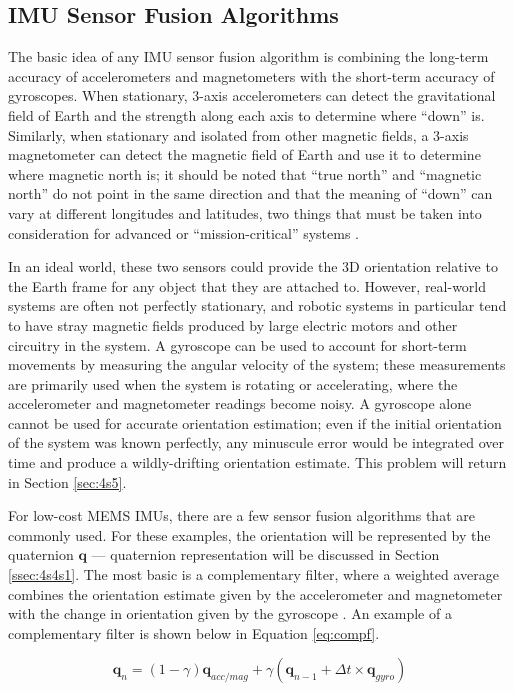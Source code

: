 \documentclass[11pt]{ucthesisCP}
\begin{document}
\subsection{IMU Sensor Fusion Algorithms} \label{ssec:4s1s2}
The basic idea of any IMU sensor fusion algorithm is combining the long-term accuracy of accelerometers and magnetometers with the short-term accuracy of gyroscopes. When stationary, 3-axis accelerometers can detect the gravitational field of Earth and the strength along each axis to determine where “down” is. Similarly, when stationary and isolated from other magnetic fields, a 3-axis magnetometer can detect the magnetic field of Earth and use it to determine where magnetic north is; it should be noted that “true north” and “magnetic north” do not point in the same direction and that the meaning of “down” can vary at different longitudes and latitudes, two things that must be taken into consideration for advanced or “mission-critical” systems \cite{imuadvnav}. 

In an ideal world, these two sensors could provide the 3D orientation relative to the Earth frame for any object that they are attached to. However, real-world systems are often not perfectly stationary, and robotic systems in particular tend to have stray magnetic fields produced by large electric motors and other circuitry in the system. A gyroscope can be used to account for short-term movements by measuring the angular velocity of the system; these measurements are primarily used when the system is rotating or accelerating, where the accelerometer and magnetometer readings become noisy. A gyroscope alone cannot be used for accurate orientation estimation; even if the initial orientation of the system was known perfectly, any minuscule error would be integrated over time and produce a wildly-drifting orientation estimate. This problem will return in Section \ref{sec:4s5}.

For low-cost MEMS IMUs, there are a few sensor fusion algorithms that are commonly used. For these examples, the orientation will be represented by the quaternion \(\mathbf{q}\) --- quaternion representation will be discussed in Section \ref{ssec:4s4s1}. The most basic is a complementary filter, where a weighted average combines the orientation estimate given by the accelerometer and magnetometer with the change in orientation given by the gyroscope \cite{sfcomp}. An example of a complementary filter is shown below in Equation \ref{eq:compf}.

\begin{equation} \label{eq:compf}
	\mathbf{q}_n = (1 - \gamma) \mathbf{q}_{acc/mag} + \gamma (\mathbf{q}_{n-1} + \Delta t \times \mathbf{q}_{gyro})
\end{equation}
\end{document}
